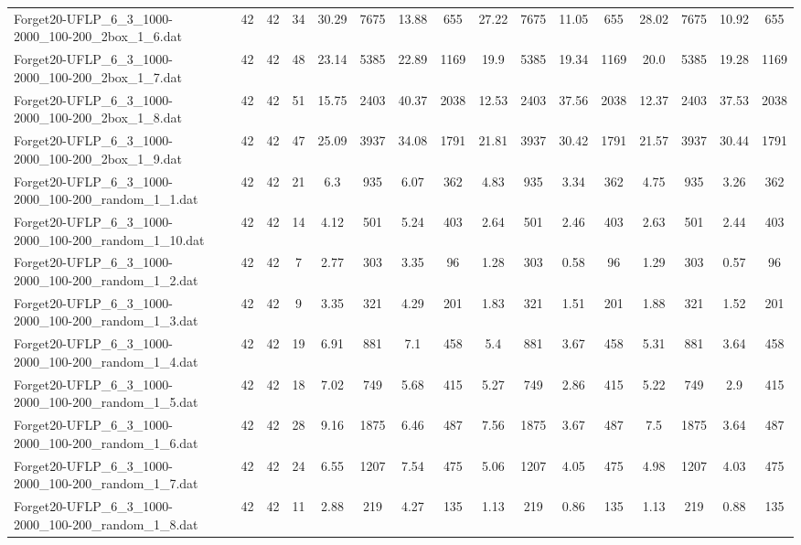 \begin{sidewaystable}[!ht]
{\begin{tabular}{lccccccccccccccc}
Forget20-UFLP\_6\_3\_1000-2000\_100-200\_2box\_1\_6.dat & 42 & 42 & 34 & 30.29 & 7675 & 13.88 & 655 & 27.22 & 7675 & 11.05 & 655 & 28.02 & 7675 & 10.92 & 655 \\
Forget20-UFLP\_6\_3\_1000-2000\_100-200\_2box\_1\_7.dat & 42 & 42 & 48 & 23.14 & 5385 & 22.89 & 1169 & 19.9 & 5385 & 19.34 & 1169 & 20.0 & 5385 & 19.28 & 1169 \\
Forget20-UFLP\_6\_3\_1000-2000\_100-200\_2box\_1\_8.dat & 42 & 42 & 51 & 15.75 & 2403 & 40.37 & 2038 & 12.53 & 2403 & 37.56 & 2038 &  \textcolor{blue2}{12.37} & 2403 & 37.53 & 2038 \\
Forget20-UFLP\_6\_3\_1000-2000\_100-200\_2box\_1\_9.dat & 42 & 42 & 47 & 25.09 & 3937 & 34.08 & 1791 & 21.81 & 3937 & 30.42 & 1791 &  \textcolor{blue2}{21.57} & 3937 & 30.44 & 1791 \\
Forget20-UFLP\_6\_3\_1000-2000\_100-200\_random\_1\_1.dat & 42 & 42 & 21 & 6.3 & 935 & 6.07 & 362 & 4.83 & 935 & 3.34 & 362 & 4.75 & 935 & 3.26 & 362 \\
Forget20-UFLP\_6\_3\_1000-2000\_100-200\_random\_1\_10.dat & 42 & 42 & 14 & 4.12 & 501 & 5.24 & 403 & 2.64 & 501 & 2.46 & 403 & 2.63 & 501 & 2.44 & 403 \\
Forget20-UFLP\_6\_3\_1000-2000\_100-200\_random\_1\_2.dat & 42 & 42 & 7 & 2.77 & 303 & 3.35 & 96 & 1.28 & 303 & 0.58 & 96 & 1.29 & 303 &  \textcolor{blue2}{0.57} & 96 \\
Forget20-UFLP\_6\_3\_1000-2000\_100-200\_random\_1\_3.dat & 42 & 42 & 9 & 3.35 & 321 & 4.29 & 201 & 1.83 & 321 & 1.51 & 201 & 1.88 & 321 & 1.52 & 201 \\
Forget20-UFLP\_6\_3\_1000-2000\_100-200\_random\_1\_4.dat & 42 & 42 & 19 & 6.91 & 881 & 7.1 & 458 & 5.4 & 881 & 3.67 & 458 & 5.31 & 881 & 3.64 & 458 \\
Forget20-UFLP\_6\_3\_1000-2000\_100-200\_random\_1\_5.dat & 42 & 42 & 18 & 7.02 & 749 & 5.68 & 415 & 5.27 & 749 & 2.86 & 415 & 5.22 & 749 & 2.9 & 415 \\
Forget20-UFLP\_6\_3\_1000-2000\_100-200\_random\_1\_6.dat & 42 & 42 & 28 & 9.16 & 1875 & 6.46 & 487 & 7.56 & 1875 & 3.67 & 487 & 7.5 & 1875 & 3.64 & 487 \\
Forget20-UFLP\_6\_3\_1000-2000\_100-200\_random\_1\_7.dat & 42 & 42 & 24 & 6.55 & 1207 & 7.54 & 475 & 5.06 & 1207 & 4.05 & 475 & 4.98 & 1207 & 4.03 & 475 \\
Forget20-UFLP\_6\_3\_1000-2000\_100-200\_random\_1\_8.dat & 42 & 42 & 11 & 2.88 & 219 & 4.27 & 135 & 1.13 & 219 & 0.86 & 135 & 1.13 & 219 & 0.88 & 135 \\

\end{tabular}}
\end{sidewaystable}
